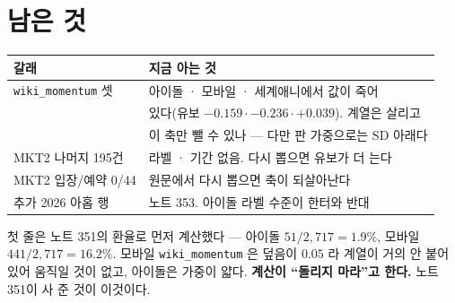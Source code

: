 \documentclass[11pt]{article}
\begin{document}
\section{남은 것}

\begin{center}
\begin{tabular}{ll}
\hline
갈래 & 지금 아는 것 \\
\hline
\texttt{wiki\_momentum} 셋 & 아이돌 · 모바일 · 세계애니에서 값이 죽어 \\
 & 있다(유보 $-0.159 \cdot -0.236 \cdot +0.039$). 계열은 살리고 \\
 & 이 축만 뺄 수 있나 --- 다만 판 가중으로는 SD 아래다 \\
MKT2 나머지 195건 & 라벨 · 기간 없음. 다시 뽑으면 유보가 더 는다 \\
MKT2 입장/예약 0/44 & 원문에서 다시 뽑으면 축이 되살아난다 \\
추가 2026 아홉 행 & 노트 353. 아이돌 라벨 수준이 한터와 반대 \\
\hline
\end{tabular}
\end{center}

첫 줄은 노트 351의 환율로 먼저 계산했다 --- 아이돌 $51/2{,}717 = 1.9\%$,
모바일 $441/2{,}717 = 16.2\%$. 모바일 \texttt{wiki\_momentum} 은 덮음이
$0.05$ 라 계열이 거의 안 붙어 있어 움직일 것이 없고, 아이돌은 가중이
얇다. \textbf{계산이 ``돌리지 마라''고 한다.} 노트 351이 사 준 것이
이것이다.
\end{document}
